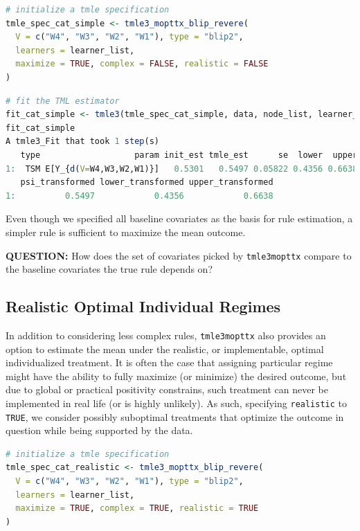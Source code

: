 \documentclass[
  12pt, krantz2,
]{krantz}
\newcommand{\passthrough}[1]{#1}
\newcommand{\1}{\mathbbm{1}}
\theoremstyle{definition}
\theoremstyle{definition}
\theoremstyle{definition}
\theoremstyle{definition}
\theoremstyle{remark}
\begin{document}
\begin{lstlisting}[language=R]
# initialize a tmle specification
tmle_spec_cat_simple <- tmle3_mopttx_blip_revere(
  V = c("W4", "W3", "W2", "W1"), type = "blip2",
  learners = learner_list,
  maximize = TRUE, complex = FALSE, realistic = FALSE
)
\end{lstlisting}

\begin{lstlisting}[language=R]
# fit the TML estimator
fit_cat_simple <- tmle3(tmle_spec_cat_simple, data, node_list, learner_list)
fit_cat_simple
A tmle3_Fit that took 1 step(s)
   type                   param init_est tmle_est      se  lower  upper
1:  TSM E[Y_{d(V=W4,W3,W2,W1)}]   0.5301   0.5497 0.05822 0.4356 0.6638
   psi_transformed lower_transformed upper_transformed
1:          0.5497            0.4356            0.6638
\end{lstlisting}

Even though we specified all baseline covariates as the basis
for rule estimation, a simpler rule is sufficient to maximize the mean outcome.

\textbf{QUESTION:} How does the set of covariates picked by \passthrough{\lstinline!tmle3mopttx!}
compare to the baseline covariates the true rule depends on?

\hypertarget{oit-eval-cat-v3}{%
\subsection{Realistic Optimal Individual Regimes}\label{oit-eval-cat-v3}}

In addition to considering less complex rules, \passthrough{\lstinline!tmle3mopttx!} also provides an
option to estimate the mean under the realistic, or implementable, optimal
individualized treatment. It is often the case that assigning particular regime
might have the ability to fully maximize (or minimize) the desired outcome, but
due to global or practical positivity constrains, such treatment can never be
implemented in real life (or is highly unlikely). As such, specifying
\passthrough{\lstinline!realistic!} to \passthrough{\lstinline!TRUE!}, we consider possibly suboptimal treatments that optimize
the outcome in question while being supported by the data.

\begin{lstlisting}[language=R]
# initialize a tmle specification
tmle_spec_cat_realistic <- tmle3_mopttx_blip_revere(
  V = c("W4", "W3", "W2", "W1"), type = "blip2",
  learners = learner_list,
  maximize = TRUE, complex = TRUE, realistic = TRUE
)
\end{lstlisting}
\end{document}
